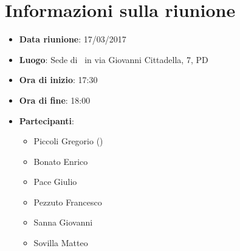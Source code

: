 \documentclass[../AnalisiDeiRequisiti.tex]{subfiles}
\begin{document}
	\section*{Informazioni sulla riunione}
		\begin{itemize}
			\item \textbf{Data riunione}: 17/03/2017
			\item \textbf{Luogo}: Sede di \proponente\ in via Giovanni Cittadella, 7, PD
			\item \textbf{Ora di inizio}: 17:30
			\item \textbf{Ora di fine}: 18:00
			\item \textbf{Partecipanti}:
				\begin{itemize}
					\item Piccoli Gregorio (\proponente)
					\item Bonato Enrico
					\item Pace Giulio
					\item Pezzuto Francesco
					\item Sanna Giovanni
					\item Sovilla Matteo
				\end{itemize}
		\end{itemize}
\end{document}
